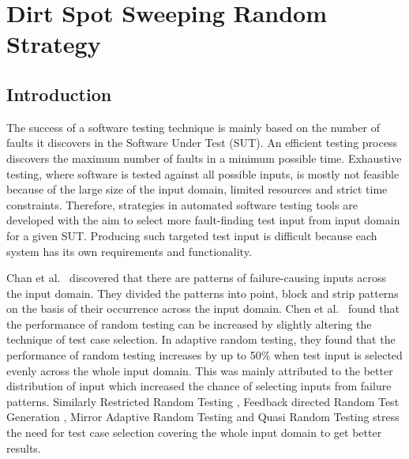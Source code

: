 \chapter{Dirt Spot Sweeping Random Strategy}
\label{chap:DSSR}

\section{Introduction}\label{sec:intro3}
The success of a software testing technique is mainly based on the number of faults it discovers in the Software Under Test (SUT). An efficient testing process discovers the maximum number of faults in a minimum possible time. Exhaustive testing, where software is tested against all possible inputs, is mostly not feasible because of the large size of the input domain, limited resources and strict time constraints. Therefore, strategies in automated software testing tools are developed with the aim to select more fault-finding test input from input domain for a given SUT. Producing such targeted test input is difficult because each system has its own requirements and functionality.

Chan et al.~\cite{Chan1996} discovered that there are patterns of failure-causing inputs across the input domain. They divided the patterns into point, block and strip patterns on the basis of their occurrence across the input domain. Chen et al.~\cite{Chen2008} found that the performance of random testing can be increased by slightly altering the technique of test case selection. In adaptive random testing, they found that the performance of random testing increases by up to 50\% when test input is selected evenly across the whole input domain. This was mainly attributed to the better distribution of input which increased the chance of selecting inputs from failure patterns. Similarly Restricted Random Testing \cite{Chan2002}, Feedback directed Random Test Generation \cite{Pacheco2007a}, Mirror Adaptive Random Testing \cite{Chen2003} and Quasi Random Testing \cite{Chen2005} stress the need for test case selection covering the whole input domain to get better results.

